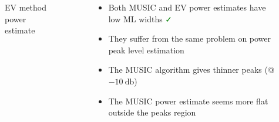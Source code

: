 \documentclass[UKenglish,8pt,aspectratio=1610]{beamer}
\begin{document}
\begin{frame}
\begin{columns}
\begin{column}{0.5\textwidth}
\begin{figure}[h!]
				\caption{EV method power estimate}
			\end{figure}
		\end{column}
		\begin{column}{0.5\textwidth}
			\begin{itemize}
			\item Both MUSIC and EV power estimates have low ML widths \textcolor{green}{\faCheck}
			\item They suffer from the same problem on power peak level estimation \textcolor{red}{\faTimes}
			\item The MUSIC algorithm gives thinner peaks (@$-10~\si{\decibel}$)
			\item The MUSIC power estimate seems more flat outside the peaks region
			\end{itemize}
		\end{column}
	\end{columns}
	\end{frame}
\end{document}
